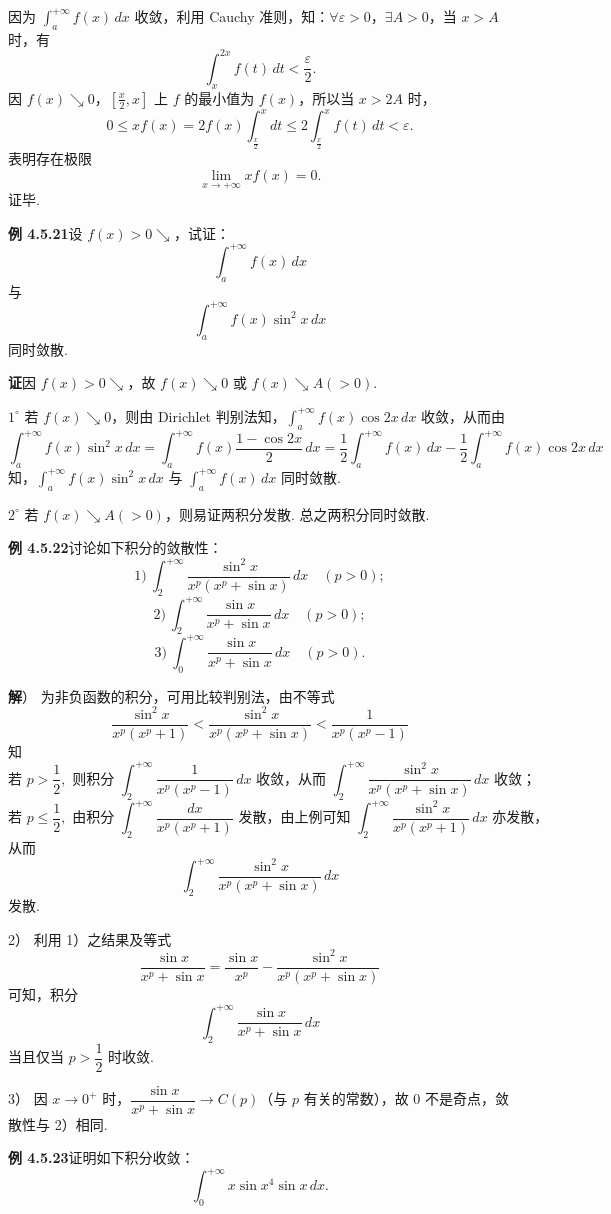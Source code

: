 \documentclass[UTF8, 12pt, fontset=fandol, oneside]{ctexart}
\begin{document}
因为 $\displaystyle\int_a^{+\infty}f(x)\,dx$ 收敛，利用 Cauchy 准则，知：$\forall\varepsilon>0$，$\exists A>0$，当 $x>A$ 时，有
\[
\int_x^{2x}f(t)\,dt<\frac\varepsilon2.
\]
因 $f(x)\searrow0$，$[\frac x2,x]$ 上 $f$ 的最小值为 $f(x)$，所以当 $x>2A$ 时，
\[
0\le xf(x)=2f(x)\int_{\frac x2}^xdt
\le2\int_{\frac x2}^xf(t)\,dt<\varepsilon.
\]
表明存在极限
\[
\lim_{x\to+\infty}xf(x)=0.
\]
证毕.

\noindent\textbf{例 4.5.21}\quad 设 $f(x)>0\searrow$，试证：
\[
\int_a^{+\infty}f(x)\,dx
\]
与
\[
\int_a^{+\infty}f(x)\sin^2x\,dx
\]
同时敛散.

\noindent\textbf{证}\quad 因 $f(x)>0\searrow$，故 $f(x)\searrow0$ 或 $f(x)\searrow A(>0)$.

$1^\circ$ 若 $f(x)\searrow0$，则由 Dirichlet 判别法知，$\displaystyle\int_a^{+\infty}f(x)\cos2x\,dx$ 收敛，从而由
\[
\int_a^{+\infty}f(x)\sin^2x\,dx
=\int_a^{+\infty}f(x)\frac{1-\cos2x}{2}\,dx
=\frac12\int_a^{+\infty}f(x)\,dx
-\frac12\int_a^{+\infty}f(x)\cos2x\,dx
\]
知，$\displaystyle\int_a^{+\infty}f(x)\sin^2x\,dx$ 与 $\displaystyle\int_a^{+\infty}f(x)\,dx$ 同时敛散.

$2^\circ$ 若 $f(x)\searrow A(>0)$，则易证两积分发散. 总之两积分同时敛散.

\noindent\textbf{例 4.5.22}\quad 讨论如下积分的敛散性：
\[
1)\ \int_2^{+\infty}\frac{\sin^2x}{x^p(x^p+\sin x)}\,dx\quad(p>0);
\]
\[
2)\ \int_2^{+\infty}\frac{\sin x}{x^p+\sin x}\,dx\quad(p>0);
\]
\[
3)\ \int_0^{+\infty}\frac{\sin x}{x^p+\sin x}\,dx\quad(p>0).
\]

\noindent\textbf{解}） 为非负函数的积分，可用比较判别法，由不等式
\[
\frac{\sin^2x}{x^p(x^p+1)}
<\frac{\sin^2x}{x^p(x^p+\sin x)}
<\frac1{x^p(x^p-1)}
\]
知
\[
\text{若 }p>\frac12,\text{ 则积分 }\int_2^{+\infty}\frac1{x^p(x^p-1)}\,dx\text{ 收敛，从而 }
\int_2^{+\infty}\frac{\sin^2x}{x^p(x^p+\sin x)}\,dx\text{ 收敛；}
\]
\[
\text{若 }p\le\frac12,\text{ 由积分 }\int_2^{+\infty}\frac{dx}{x^p(x^p+1)}\text{ 发散，由上例可知 }
\int_2^{+\infty}\frac{\sin^2x}{x^p(x^p+1)}\,dx\text{ 亦发散，}
\]
从而
\[
\int_2^{+\infty}\frac{\sin^2x}{x^p(x^p+\sin x)}\,dx
\]
发散.

2） 利用 1）之结果及等式
\[
\frac{\sin x}{x^p+\sin x}
=\frac{\sin x}{x^p}
-\frac{\sin^2x}{x^p(x^p+\sin x)}
\]
可知，积分
\[
\int_2^{+\infty}\frac{\sin x}{x^p+\sin x}\,dx
\]
当且仅当 $p>\dfrac12$ 时收敛.

3） 因 $x\to0^+$ 时，$\dfrac{\sin x}{x^p+\sin x}\to C(p)$（与 $p$ 有关的常数），故 $0$ 不是奇点，敛散性与 2）相同.

\noindent\textbf{例 4.5.23}\quad 证明如下积分收敛：
\[
\int_0^{+\infty}x\sin x^4\sin x\,dx.
\]
\end{document}
